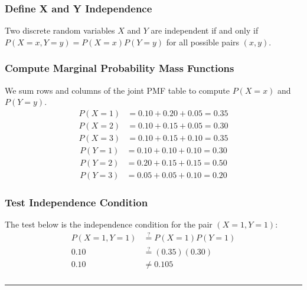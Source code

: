 \documentclass{article}
\begin{document}
\subsubsection*{Define X and Y Independence}
\parbox{\textwidth}{
Two discrete random variables $X$ and $Y$ are independent if and only if $P(X=x, Y=y) = P(X=x)P(Y=y)$ for all possible pairs $(x, y)$.
\subsubsection*{Compute Marginal Probability Mass Functions}


 We sum rows and columns of the joint PMF table to compute $P(X=x)$ and $P(Y=y)$.
\begin{align*}
    P(X=1) &= 0.10 + 0.20 + 0.05 = 0.35 \\
    P(X=2) &= 0.10 + 0.15 + 0.05 = 0.30 \\
    P(X=3) &= 0.10 + 0.15 + 0.10 = 0.35
\end{align*}
\begin{align*}
    P(Y=1) &= 0.10 + 0.10 + 0.10 = 0.30 \\
    P(Y=2) &= 0.20 + 0.15 + 0.15 = 0.50 \\
    P(Y=3) &= 0.05 + 0.05 + 0.10 = 0.20
\end{align*}
}
\vspace{1em}
\subsubsection*{Test Independence Condition}
The test below is the independence condition for the pair $(X=1, Y=1)$:
\begin{align*}
    P(X=1, Y=1) &\stackrel{?}{=} P(X=1)P(Y=1) \\
    0.10 &\stackrel{?}{=} (0.35)(0.30) \\
    0.10 &\neq 0.105
\end{align*}

\subsubsection*{}

\noindent\rule{\textwidth}{0.4pt}\\

\newpage
\end{document}
